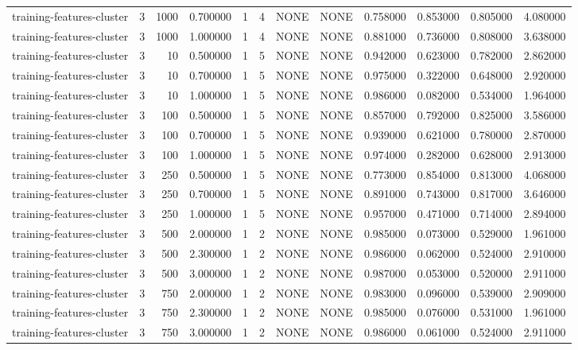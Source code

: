 \begin{tabular}{lrrrllllrrrr}
training-features-cluster & 3 & 1000 & 0.700000 & 1 & 4 & NONE & NONE & 0.758000 & 0.853000 & 0.805000 & 4.080000 \\
training-features-cluster & 3 & 1000 & 1.000000 & 1 & 4 & NONE & NONE & 0.881000 & 0.736000 & 0.808000 & 3.638000 \\
training-features-cluster & 3 & 10 & 0.500000 & 1 & 5 & NONE & NONE & 0.942000 & 0.623000 & 0.782000 & 2.862000 \\
training-features-cluster & 3 & 10 & 0.700000 & 1 & 5 & NONE & NONE & 0.975000 & 0.322000 & 0.648000 & 2.920000 \\
training-features-cluster & 3 & 10 & 1.000000 & 1 & 5 & NONE & NONE & 0.986000 & 0.082000 & 0.534000 & 1.964000 \\
training-features-cluster & 3 & 100 & 0.500000 & 1 & 5 & NONE & NONE & 0.857000 & 0.792000 & 0.825000 & 3.586000 \\
training-features-cluster & 3 & 100 & 0.700000 & 1 & 5 & NONE & NONE & 0.939000 & 0.621000 & 0.780000 & 2.870000 \\
training-features-cluster & 3 & 100 & 1.000000 & 1 & 5 & NONE & NONE & 0.974000 & 0.282000 & 0.628000 & 2.913000 \\
training-features-cluster & 3 & 250 & 0.500000 & 1 & 5 & NONE & NONE & 0.773000 & 0.854000 & 0.813000 & 4.068000 \\
training-features-cluster & 3 & 250 & 0.700000 & 1 & 5 & NONE & NONE & 0.891000 & 0.743000 & 0.817000 & 3.646000 \\
training-features-cluster & 3 & 250 & 1.000000 & 1 & 5 & NONE & NONE & 0.957000 & 0.471000 & 0.714000 & 2.894000 \\
training-features-cluster & 3 & 500 & 2.000000 & 1 & 2 & NONE & NONE & 0.985000 & 0.073000 & 0.529000 & 1.961000 \\
training-features-cluster & 3 & 500 & 2.300000 & 1 & 2 & NONE & NONE & 0.986000 & 0.062000 & 0.524000 & 2.910000 \\
training-features-cluster & 3 & 500 & 3.000000 & 1 & 2 & NONE & NONE & 0.987000 & 0.053000 & 0.520000 & 2.911000 \\
training-features-cluster & 3 & 750 & 2.000000 & 1 & 2 & NONE & NONE & 0.983000 & 0.096000 & 0.539000 & 2.909000 \\
training-features-cluster & 3 & 750 & 2.300000 & 1 & 2 & NONE & NONE & 0.985000 & 0.076000 & 0.531000 & 1.961000 \\
training-features-cluster & 3 & 750 & 3.000000 & 1 & 2 & NONE & NONE & 0.986000 & 0.061000 & 0.524000 & 2.911000 \\

\end{tabular}
